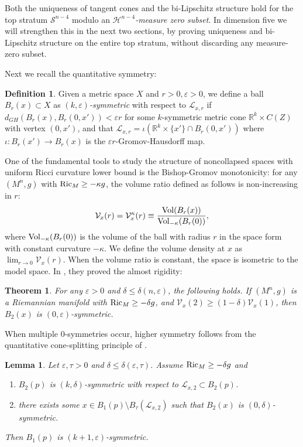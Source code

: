 \documentclass[11pt,reqno]{amsart}
\numberwithin{equation}{section}
\newcommand{\RR}{\mathds{R}}
\newcommand{\Ric}{{\rm Ric}}
\newcommand{\Vol}{{\rm Vol}}
\newcommand{\cH}{\mathcal{H}}
\newcommand{\cL}{\mathcal{L}}
\newcommand{\cS}{\mathcal{S}}
\newcommand{\cV}{\mathcal{V}}
\newtheorem{theorem}[thm]{Theorem}
\newtheorem{lemma}[thm]{Lemma}
\theoremstyle{definition}
\newtheorem{definition}[thm]{Definition}
\theoremstyle{remark}
\begin{document}
Both the uniqueness of tangent cones and the bi-Lipschitz structure hold for the top stratum $\cS^{n-4}$ modulo an \emph{$\cH^{n-4}$-measure zero subset}. In dimension five we will strengthen this in the next two sections, by proving uniqueness and bi-Lipschitz structure on the entire top stratum, without discarding any measure-zero subset.


Next we recall the quantitative symmetry:

\begin{definition}
    Given a metric space $X$ and $r>0, \varepsilon > 0$, we define a ball $B_r(x) \subset X$ as \emph{$(k, \varepsilon)$-symmetric} with respect to $\cL_{x,r}$ if $d_{GH}(B_r(x), B_r(0,x')) < \varepsilon r$ for some $k$-symmetric metric cone $\RR^k \times C(Z)$ with vertex $(0,x')$, and that $\cL_{x,r} = \iota(\RR^k \times \{x'\} \cap B_r(0,x'))$ where $\iota : B_r(x') \to B_r(x)$ is the $\varepsilon r$-Gromov-Hausdorff map.
\end{definition}

One of the fundamental tools to study the structure of noncollapsed spaces with uniform Ricci curvature lower bound is the Bishop-Gromov monotonicity: for any $(M^n,g)$ with $\Ric_M \ge -\kappa g$, the volume ratio defined as follows is non-increasing in $r$:
\begin{equation*}
    \cV_x(r) = \cV^{\kappa}_x(r) \equiv \frac{\Vol(B_r(x))}{\Vol_{-\kappa}(B_r(0))},
\end{equation*}
where $\Vol_{-\kappa}(B_r(0))$ is the volume of the ball with radius $r$ in the space form with constant curvature $-\kappa$. We define the volume density at $x$ as $\lim_{r\to 0}\cV_x(r)$. When the volume ratio is constant, the space is isometric to the model space. In \cite{cc}, they proved the almost rigidity:
\begin{theorem}\label{t:almost volume cone}
    For any $\varepsilon>0$ and $\delta\leqslant \delta(n,\varepsilon)$, the following holds. If $(M^n,g)$ is a Riemannian manifold with $\Ric_M \ge -\delta g$, and $\cV_x(2) \ge (1-\delta) \cV_x(1) $, then $B_2(x)$ is $(0,\varepsilon)$-symmetric.
\end{theorem}

When multiple $0$-symmetries occur, higher symmetry follows from the quantitative cone-splitting principle of \cite{chn13}.
\begin{lemma}\label{l:cone splitting}
    Let $\varepsilon,\tau>0$ and $\delta\leqslant \delta(\varepsilon,\tau)$. Assume $\Ric_M \ge -\delta g$ and
    \begin{enumerate}
        \item $B_2(p)$ is $(k,\delta)$-symmetric with respect to $\cL_{x,2} \subset B_2(p)$.
        \item there exists some $x \in B_1(p) \setminus B_{\tau}(\cL_{x,2})$ such that $B_2(x)$ is $(0,\delta)$-symmetric.
    \end{enumerate}
    Then $B_1(p)$ is $(k+1,\varepsilon)$-symmetric.
\end{lemma}
\end{document}
